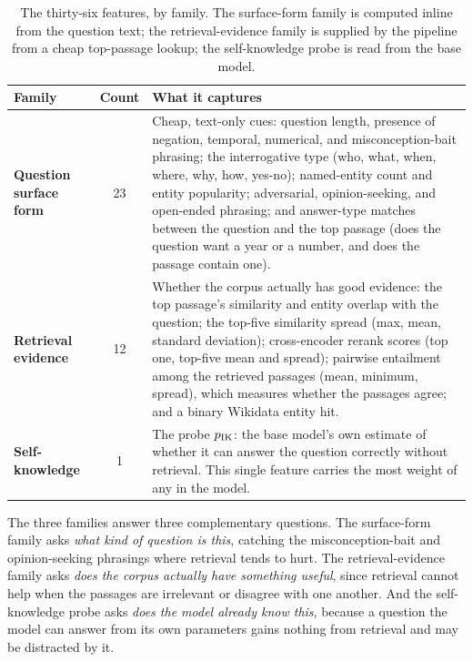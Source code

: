 \begin{table}[htbp]
\centering
\caption[The classifier's feature families]{The thirty-six features, by family. The
surface-form family is computed inline from the question text; the retrieval-evidence
family is supplied by the pipeline from a cheap top-passage lookup; the self-knowledge
probe is read from the base model.}
\label{tab:ruc-features}
\small
\renewcommand{\arraystretch}{1.22}
\begin{tabularx}{\textwidth}{@{}l c >{\raggedright\arraybackslash}X@{}}
\toprule
\textbf{Family} & \textbf{Count} & \textbf{What it captures} \\
\midrule
\textbf{Question surface form}
  & 23
  & Cheap, text-only cues: question length, presence of negation, temporal,
    numerical, and misconception-bait phrasing; the interrogative type (who, what,
    when, where, why, how, yes-no); named-entity count and entity popularity;
    adversarial, opinion-seeking, and open-ended phrasing; and answer-type matches
    between the question and the top passage (does the question want a year or a
    number, and does the passage contain one). \\
\addlinespace[2pt]
\textbf{Retrieval evidence}
  & 12
  & Whether the corpus actually has good evidence: the top passage's similarity and
    entity overlap with the question; the top-five similarity spread (max, mean,
    standard deviation); cross-encoder rerank scores (top one, top-five mean and
    spread); pairwise entailment among the retrieved passages (mean, minimum,
    spread), which measures whether the passages agree; and a binary Wikidata
    entity hit. \\
\addlinespace[2pt]
\textbf{Self-knowledge}
  & 1
  & The probe $p_{\text{IK}}$: the base model's own estimate of whether it can answer the
    question correctly without retrieval. This single feature carries the most
    weight of any in the model. \\
\bottomrule
\end{tabularx}
\end{table}

The three families answer three complementary questions. The surface-form family asks
\emph{what kind of question is this}, catching the misconception-bait and
opinion-seeking phrasings where retrieval tends to hurt. The retrieval-evidence family
asks \emph{does the corpus actually have something useful}, since retrieval cannot
help when the passages are irrelevant or disagree with one another. And the
self-knowledge probe asks \emph{does the model already know this}, because a question
the model can answer from its own parameters gains nothing from retrieval and may be
distracted by it.

